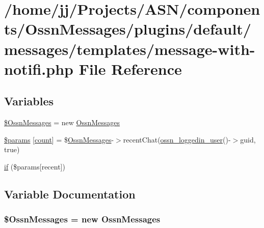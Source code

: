 \hypertarget{message-with-notifi_8php}{}\section{/home/jj/\+Projects/\+A\+S\+N/components/\+Ossn\+Messages/plugins/default/messages/templates/message-\/with-\/notifi.php File Reference}
\label{message-with-notifi_8php}
\subsection*{Variables}
\begin{DoxyCompactItemize}
\item 
\hyperlink{message-with-notifi_8php_a2365ec629dc6371d4b02dda25a62b992}{\$\+Ossn\+Messages} = new \hyperlink{class_ossn_messages}{Ossn\+Messages}
\item 
\hyperlink{message-with-notifi_8php_ac699a1602e8805cf6fea0b288aef815a}{\$params} \mbox{[}\textquotesingle{}\hyperlink{photos_2pages_2photos_8php_a364678aa3bd05301b3d1b8650653cf48}{count}\textquotesingle{}\mbox{]} = \$\hyperlink{class_ossn_messages}{Ossn\+Messages}-\/$>$recent\+Chat(\hyperlink{ossn_8lib_8users_8php_aa3c8068d0e6638b414d6a2f6c62565b8}{ossn\+\_\+loggedin\+\_\+user}()-\/$>$guid, true)
\item 
\hyperlink{message-with-notifi_8php_a8310ac66d015bc317b9322bc2bcd45db}{if} (\$params\mbox{[}\textquotesingle{}recent\textquotesingle{}\mbox{]})
\end{DoxyCompactItemize}


\subsection{Variable Documentation}
\subsubsection[{\texorpdfstring{\$\+Ossn\+Messages}{$OssnMessages}}]{\setlength{\rightskip}{0pt plus 5cm}\${\bf Ossn\+Messages} = new {\bf Ossn\+Messages}}\hypertarget{message-with-notifi_8php_a2365ec629dc6371d4b02dda25a62b992}{}\label{message-with-notifi_8php_a2365ec629dc6371d4b02dda25a62b992}


